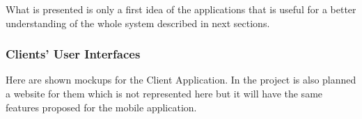 \documentclass[a4paper]{article}
\begin{document}
What is presented is only a first idea of the applications that is useful for a better understanding of the whole system described in next sections.

\newlength{\mockupWidth}
\setlength{\mockupWidth}{.3\textwidth}

\subsubsection{Clients' User Interfaces}

Here are shown mockups for the Client Application. In the project is also planned a website for them which is not represented here but it will have the same features proposed for the mobile application.
\end{document}
